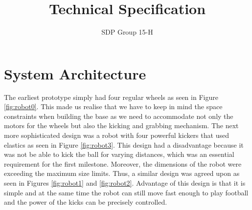 \documentclass[12pt]{article}
\title{Technical Specification}
\author{SDP Group 15-H}
\begin{document}
\graphicspath{ {images/} }
\maketitle

\section{System Architecture}

The earliest prototype simply had four regular wheels as seen in Figure
\ref{fig:robot0}. This made us realise that we have to keep in mind the space
constraints when building the base as we need to accommodate not only the motors
for the wheels but also the kicking and grabbing mechanism.
The next more sophisticated design was a robot with four powerful kickers
that used elastics as seen in Figure \ref{fig:robot3}. This design had a
disadvantage because it was not be able to kick the ball for varying distances,
which was an essential requirement for the first milestone. Moreover, the
dimensions of the robot were exceeding the maximum size limits. Thus, a similar
design was agreed upon as seen in Figures \ref{fig:robot1} and \ref{fig:robot2}.
Advantage of this design is that it is simple and at the same time the robot can
still move fast enough to play football and the power of the kicks can be
precisely controlled.
\end{document}
